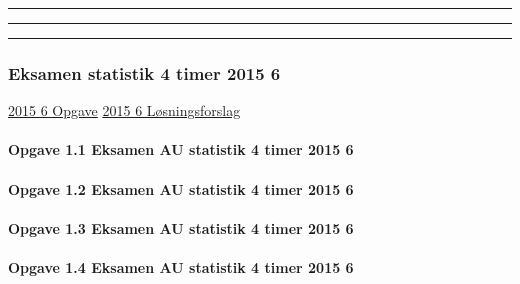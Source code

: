 \documentclass[]{book}
\let\oldparagraph\paragraph
\renewcommand{\paragraph}[1]{\oldparagraph{#1}\mbox{}}
\begin{document}
\begin{center}\rule{0.5\linewidth}{\linethickness}\end{center}

\begin{center}\rule{0.5\linewidth}{\linethickness}\end{center}

\begin{center}\rule{0.5\linewidth}{\linethickness}\end{center}

\hypertarget{eksamen-statistik-4-timer-2015-6}{%
\subsubsection{Eksamen statistik 4 timer 2015
6}\label{eksamen-statistik-4-timer-2015-6}}

\href{https://www.dropbox.com/s/lpyp894as98ho11/Smartlearning\%20AU\%202015\%206.pdf?dl=1}{2015
6 Opgave}
\href{https://www.dropbox.com/s/kf4avnc43qpz20d/2015\%206\%20AU\%20SMART\%20Vejledende.docx?dl=1}{2015
6 Løsningsforslag}

\hypertarget{opgave-1.1-eksamen-au-statistik-4-timer-2015-6}{%
\paragraph{Opgave 1.1 Eksamen AU statistik 4 timer 2015
6}\label{opgave-1.1-eksamen-au-statistik-4-timer-2015-6}}

\hypertarget{opgave-1.2-eksamen-au-statistik-4-timer-2015-6}{%
\paragraph{Opgave 1.2 Eksamen AU statistik 4 timer 2015
6}\label{opgave-1.2-eksamen-au-statistik-4-timer-2015-6}}

\hypertarget{opgave-1.3-eksamen-au-statistik-4-timer-2015-6}{%
\paragraph{Opgave 1.3 Eksamen AU statistik 4 timer 2015
6}\label{opgave-1.3-eksamen-au-statistik-4-timer-2015-6}}

\hypertarget{opgave-1.4-eksamen-au-statistik-4-timer-2015-6}{%
\paragraph{Opgave 1.4 Eksamen AU statistik 4 timer 2015
6}\label{opgave-1.4-eksamen-au-statistik-4-timer-2015-6}}
\end{document}
